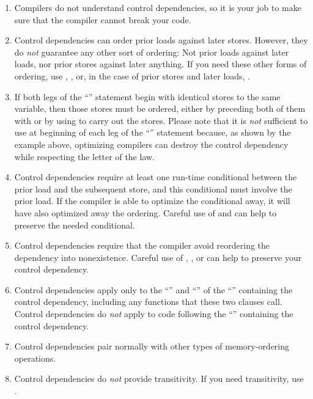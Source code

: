 \begin{enumerate}
\item	Compilers do not understand control dependencies, so it is
	your job to make sure that the compiler cannot break your code.

\item	Control dependencies can order prior loads against later stores.
	However, they do \emph{not} guarantee any other sort of ordering:
	Not prior loads against later loads, nor prior stores against
	later anything.
	If you need these other forms of ordering, use ,
	, or, in the case of prior stores and later loads,
	.

\item	If both legs of the ``'' statement begin with identical stores
	to the same variable, then those stores must be ordered,
	either by preceding both of them with  or by using
	 to carry out the stores.
	Please note that it is \emph{not} sufficient to use 
	at beginning of each leg of the ``'' statement because, as shown
	by the example above, optimizing compilers can destroy the control
	dependency while respecting the letter of the  law.

\item	Control dependencies require at least one run-time conditional
	between the prior load and the subsequent store, and this
	conditional must involve the prior load.
	If the compiler is able to optimize the conditional away, it
	will have also optimized away the ordering.
	Careful use of  and  can help
	to preserve the needed conditional.

\item	Control dependencies require that the compiler avoid reordering
	the dependency into nonexistence.
	Careful use of , , or
	 can help to preserve your control
	dependency.

\item	Control dependencies apply only to the ``'' and
	``'' of the ``'' containing the control
	dependency, including any functions that these two clauses call.
	Control dependencies do \emph{not} apply to code following the
	``'' containing the control dependency.

\item	Control dependencies pair normally with other types of
	memory-ordering operations.

\item	Control dependencies do \emph{not} provide transitivity.
	If you need transitivity, use .
\end{enumerate}

